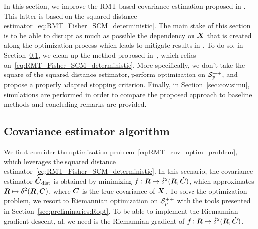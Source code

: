 \documentclass{article}
\theoremstyle{plain}
\theoremstyle{definition}
\theoremstyle{remark}
\begin{document}
In this section, we improve the RMT based covariance estimation proposed in \cite{tiomoko2019random}. This latter is based on the squared distance estimator~\eqref{eq:RMT_Fisher_SCM_deterministic}. The main stake of this section is to be able to disrupt as much as possible the dependency on $\boldsymbol{X}$ that is created along the optimization process which leads to mitigate results in \cite{tiomoko2019random}.
To do so, in Section~\ref{sec:cov:algo}, we clean up the method proposed in~\cite{tiomoko2019random}, which relies on~\eqref{eq:RMT_Fisher_SCM_deterministic}.
More specifically, we don't take the square of the squared distance estimator, perform optimization on $\mathcal{S}^{++}_{p}$, and propose a properly adapted stopping criterion.
%
Finally, in Section~\ref{sec:cov:simu}, simulations are performed in order to compare the proposed approach to baseline methods and concluding remarks are provided.


%




\subsection{Covariance estimator algorithm}
\label{sec:cov:algo}
We first consider the optimization problem~\eqref{eq:RMT_cov_optim_problem}, which leverages the squared distance estimator~\eqref{eq:RMT_Fisher_SCM_deterministic}.
In this scenario, the covariance estimator $\boldsymbol{\hat{C}}_{\textup{dist}}$ is obtained by minimizing $f:\boldsymbol{R}\mapsto\hat{\delta}^2(\boldsymbol{R},\boldsymbol{\hat{C}})$, which approximates $\boldsymbol{R}\mapsto\delta^2(\boldsymbol{R},\boldsymbol{C})$, where $\boldsymbol{C}$ is the true covariance of $\boldsymbol{X}$.
%
To solve the optimization problem, we resort to Riemannian optimization on $\mathcal{S}^{++}_{p}$ with the tools presented in Section~\ref{sec:preliminaries:Ropt}.
To be able to implement the Riemannian gradient descent, all we need is the Riemannian gradient of $f:\boldsymbol{R}\mapsto\hat{\delta}^2(\boldsymbol{R},\boldsymbol{\hat{C}})$.
\end{document}
